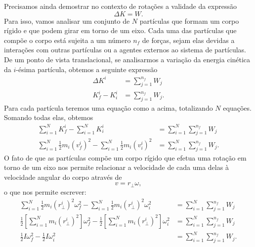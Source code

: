 Precisamos ainda demostrar no contexto de rotações a validade da expressão
\begin{equation}
    \Delta K = W.
\end{equation}
%
Para isso, vamos analisar um conjunto de $N$ partículas que formam um corpo rígido e que podem girar em torno de um eixo. Cada uma das partículas que compõe o corpo está sujeita a um número $n_f$ de forças, sejam elas devidas a interações com outras partículas ou a agentes externos ao sistema de partículas. De um ponto de vista translacional, se analisarmos a variação da energia cinética da $i$-ésima partícula, obtemos a seguinte expressão
\begin{align}
    \Delta K^i &= \sum_{j=1}^{n_f} W_j \\
    K_f^i - K_i^i &= \sum_{j=1}^{n_f} W_j.
\end{align}
%
Para cada partícula teremos uma equação como a acima, totalizando $N$ equações. Somando todas elas, obtemos
\begin{align}
    \sum_{i = 1}^N K_f^i - \sum_{i = 1}^N K_i^i &= \sum_{i = 1}^N\sum_{j=1}^{n_f} W_j \\
    \sum_{i = 1}^N \frac{1}{2}m_i (v_f^i)^2 - \sum_{i = 1}^N \frac{1}{2}m_i(v_i^i)^2 &= \sum_{i = 1}^N\sum_{j=1}^{n_f} W_j.
\end{align}
%
O fato de que as partículas compõe um corpo rígido que efetua uma rotação em torno de um eixo nos permite relacionar a velocidade de cada uma delas à velocidade angular do corpo através de
\begin{equation*}
v = r_\perp \omega,
\end{equation*}
%
o que nos permite escrever:
\begin{align}
    \sum_{i = 1}^N \frac{1}{2}m_i (r_\perp^i)^2 \omega_f^2 - \sum_{i = 1}^N \frac{1}{2}m_i (r_\perp^i)^2\omega_i^2 &= \sum_{i = 1}^N\sum_{j=1}^{n_f} W_j \\
    \frac{1}{2}\left[\sum_{i = 1}^N m_i (r_\perp^i)^2\right]\omega_f^2 - \frac{1}{2}\left[\sum_{i = 1}^N m_i (r_\perp^i)^2\right]\omega_i^2 &= \sum_{i = 1}^N\sum_{j=1}^{n_f} W_j \\
    \frac{1}{2}I\omega_f^2 - \frac{1}{2}I\omega_i^2 &= \sum_{i = 1}^N\sum_{j=1}^{n_f} W_j.\label{Eq:TeoremaTrabalhoEnergiaRotQuaseFinal}
\end{align}
%
